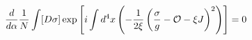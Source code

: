 \begin{equation}  \label{23}
\frac{d}{d\alpha}\frac{1}{N}\int [D\sigma]\exp\left[i\int d^{4}x\left(-\frac{%
1}{2\xi}\left(\frac{\sigma}{g}-\mathcal{O}-\xi J\right)^{2}\right)\right]=0
\end{equation}

